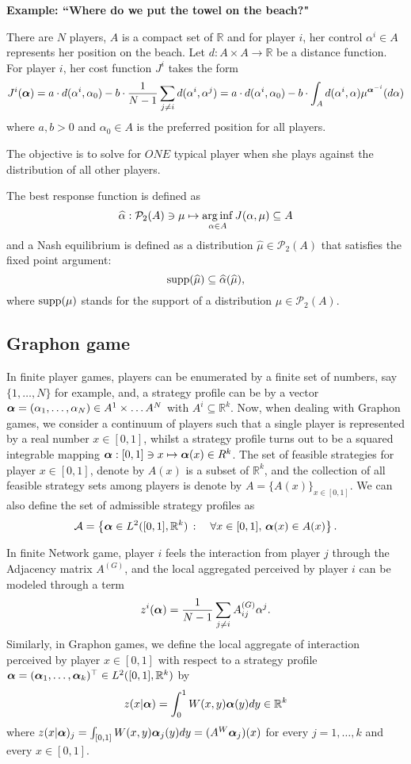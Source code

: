 \textbf{Example: ``Where do we put the towel on the beach?"  }

There are $N$ players, $A$ is a compact set of $\mathbb{R}$ and for player $i$, her control $\alpha^i \in A$ represents her position on the beach. Let $d: A \times A \to \mathbb{R}$ be a distance function. For player $i$, her cost function $J^i$ takes the form
$$
	J^i(\boldsymbol{\alpha}) = a \cdot d(\alpha^i, \alpha_0) - b \cdot \frac{1}{N-1} \sum_{j \neq i} d(\alpha^i, \alpha^j)
	= a \cdot d(\alpha^i, \alpha_0) - b \cdot \int_{A} d(\alpha^i, \alpha) \mu^{\boldsymbol{\alpha}^{-i}}(d\alpha)
$$
where $a, b > 0$ and $\alpha_0 \in A$ is the preferred position for all players.

The objective is to solve for $ONE$ typical player when she plays against the distribution of all other players.

The best response function is defined as
$$
	\widehat{\alpha} : \mathcal{P}_2(A) \ni \mu \mapsto \operatorname*{arg\,inf}_{\alpha \in A} J(\alpha, \mu)  \subseteq A 
$$
and a Nash equilibrium is defined as a distribution $\hat{\mu} \in \mathcal{P}_2(A)$ that satisfies the fixed point argument:
$$
	\operatorname{supp}(\widehat{\mu}) \subseteq \widehat{\alpha}(\widehat{\mu}),
$$
where $\operatorname{supp}(\mu)$ stands for the support of a distribution $\mu\in \mathcal{P}_2(A)$. 



\subsection{Graphon game}

In finite player games, players can be enumerated by a finite set of numbers, say $\{1, \ldots, N\}$ for example, and, a strategy profile can be by a vector $\boldsymbol{\alpha} =(\alpha_1, \ldots, \alpha_N) \in A^1 \times \ldots A^N$ with $A^i \subseteq \mathbb{R}^k$. Now, when dealing with Graphon games, we consider a continuum of players such that a single player is represented by a real number $x\in [0,1]$, whilst a strategy profile turns out to be a squared integrable mapping $\boldsymbol{\alpha} : [0,1] \ni x \mapsto \boldsymbol{\alpha}(x) \in R^k$. The set of feasible strategies for player $x\in[0,1]$, denote by $A(x)$ is a subset of $\mathbb{R}^{k}$, and the collection of all feasible strategy sets among players is denote by $A = \{A(x)\}_{x\in [0,1]}$. We can also define the set of admissible strategy profiles as 
$$
\mathcal{A} = \left\{ \boldsymbol{\alpha} \in L^{2}([0,1], \mathbb{R}^k) \, : \quad \forall x \in [0,1], \, \boldsymbol{\alpha}(x) \in A(x) \right\}.
$$


In finite Network game, player $i$ feels the interaction from player $j$ through the Adjacency matrix $A^{(G)}$, and the local aggregated perceived by player $i$ can be modeled through a term 
$$
	z^i(\boldsymbol{\alpha}) = \frac{1}{N-1} \sum_{j \neq i} A_{ij}^{(G)} \alpha^j.
$$
Similarly, in Graphon games, we define the local aggregate of interaction perceived by player $x \in [0,1]$ with respect to a strategy profile $\boldsymbol{\alpha} = (\boldsymbol{\alpha}_1,\ldots, \boldsymbol{\alpha}_k)^\top \in L^2([0,1], \mathbb{R}^k)$ by
$$
	z(x | \boldsymbol{\alpha}) = \int_{0}^{1} W(x,y) \boldsymbol{\alpha}(y) dy \in \mathbb{R}^k
$$
where $z(x|\boldsymbol{\alpha})_j = \int_{[0,1]} W(x,y) \boldsymbol{\alpha}_j(y) dy =( A^W \boldsymbol{\alpha}_j )(x)$ for every $j=1, \ldots, k$ and every $x\in [0,1]$.

